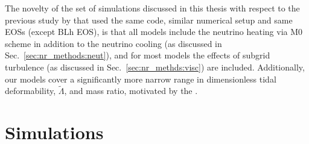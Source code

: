 %


The novelty of the set of simulations discussed in this thesis with respect to the 
previous study by \citet{Radice:2018pdn} that used the same code,
similar numerical setup 
and same \acp{EOS} (except BLh \ac{EOS}), is that all models include the neutrino heating via 
M0 scheme in addition to the neutrino cooling 
(as discussed in Sec.~\ref{sec:nr_methods:neut}), 
and for most models the effects of subgrid turbulence 
(as discussed in Sec.~\ref{sec:nr_methds:visc}) 
are included. Additionally, our models cover a significantly more narrow 
range in 
dimensionless tidal deformability, $\tilde{\Lambda}$, and mass ratio, motivated by the \GW{}.



\section{Simulations}\label{sec:bns_merg:sims}




